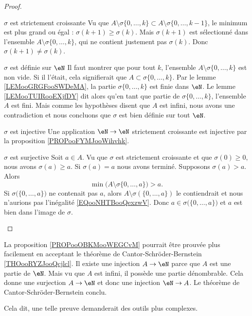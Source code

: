 \begin{proof}
\begin{subproof}
        \item[\( \sigma\) est strictement croissante]
            Vu que \( A\setminus\sigma\{ 0,\ldots, k \}\subset A\setminus\sigma\{ 0,\ldots, k-1 \}\), le minimum est plus grand ou égal : \( \sigma(k+1)\geq \sigma(k)\). Mais \( \sigma(k+1)\) est sélectionné dans l'ensemble \( A\setminus\sigma\{ 0,\ldots, k \}\), qui ne contient justement pas \( \sigma(k)\). Donc \( \sigma(k+1)\neq \sigma(k)\).
        \item[\( \sigma\) est définie sur \( \eN\)]
            Il faut montrer que pour tout \( k\), l'ensemble \( A\setminus\sigma\{ 0,\ldots, k \}\) est non vide. Si il l'était, cela signifierait que \( A\subset \sigma\{ 0,\ldots, k \}\). Par le lemme \ref{LEMooGRGFooSWDeMA}, la partie \( \sigma\{ 0,\ldots, k \}\) est finie dans \( \eN\). Le lemme \ref{LEMooTUIRooEXjfDY} dit alors qu'en tant que partie de \( \sigma\{ 0,\ldots, k \}\), l'ensemble \( A\) est fini. Mais comme les hypothèses disent que \( A\) est infini, nous avons une contradiction et nous concluons que \( \sigma\) est bien définie sur tout \( \eN\).
        \item[\( \sigma\) est injective]
            Une application \( \eN\to \eN\) strictement croissante est injective par la proposition \ref{PROPooFYMJooWihvhk}.
        \item[\( \sigma\) est surjective]
            Soit \( a\in A\). Vu que \( \sigma\) est strictement croissante et que \( \sigma(0)\geq 0\), nous avons \( \sigma(a)\geq a\). Si \( \sigma(a)=a\) nous avons terminé. Supposons \( \sigma(a)>a\). Alors
            \begin{equation}        \label{EQooNHTBooQexzwV}
                \min\big( A\setminus\sigma\{ 0,\ldots, a \} \big)>a.
            \end{equation}
            Si \( \sigma\big( \{ 0,\ldots, a \} \big)\) ne contenait pas \( a\), alors \( A\setminus \sigma(\{ 0,\ldots, a \})\) le contiendrait et nous n'aurions pas l'inégalité \eqref{EQooNHTBooQexzwV}. Donc \( a\in \sigma\big( \{ 0,\ldots, a \} \big)\) et \( a\) est bien dans l'image de \( \sigma\).
    \end{subproof}
\end{proof}

\begin{normaltext}
    La proposition \ref{PROPooOBKMooWEGCvM} pourrait être prouvée plus facilement en acceptant le théorème de Cantor-Schröder-Bernstein \ref{THOooRYZJooQcjlcl}. Il existe une injection \( A\to \eN\) parce que \( A\) est une partie de \( \eN\). Mais vu que \( A\) est infini, il possède une partie dénombrable. Cela donne une surjection \( A\to \eN\) et donc une injection \( \eN\to A\). Le théorème de Cantor-Schröder-Bernstein conclu.

    Cela dit, une telle preuve demanderait des outils plus complexes.
\end{normaltext}


